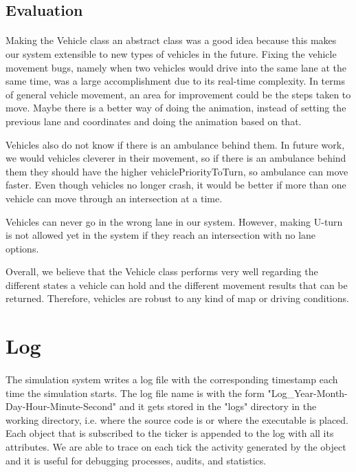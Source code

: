 \documentclass[a4paper,11pt,titlepage]{article}
\begin{document}
\subsection{Evaluation}
\paragraph{}
Making the Vehicle class an abstract class was a good idea because this makes our system extensible to new types of vehicles in the future. Fixing the vehicle movement bugs, namely when two vehicles would drive into the same lane at the same time, was a large accomplishment due to its real-time complexity. In terms of general vehicle movement, an area for improvement could be the steps taken to move. Maybe there is a better way of doing the animation, instead of setting the previous lane and coordinates and doing the animation based on that. 

Vehicles also do not know if there is an ambulance behind them. In future work, we would vehicles cleverer in their movement, so if there is an ambulance behind them they should have the higher vehiclePriorityToTurn, so ambulance can move faster.  Even though vehicles no longer crash, it would be better if more than one vehicle can move through an intersection at a time.

Vehicles can never go in the wrong lane in our system. However, making U-turn is not allowed yet in the system if they reach an intersection with no lane options.

Overall, we believe that the Vehicle class performs very well regarding the different states a vehicle can hold and the different movement results that can be returned. Therefore, vehicles are robust to any kind of map or driving conditions.

\section{Log}
\paragraph{}
The simulation system writes a log file with the corresponding timestamp each time the simulation starts. The log file name is with the form "Log\_Year-Month-Day-Hour-Minute-Second" and it gets stored in the "logs" directory in the working directory, i.e. where the source code is or where the executable is placed. Each object that is subscribed to the ticker is appended to the log with all its attributes. We are able to trace on each tick the activity generated by the object and it is useful for debugging processes, audits, and statistics.
\end{document}
